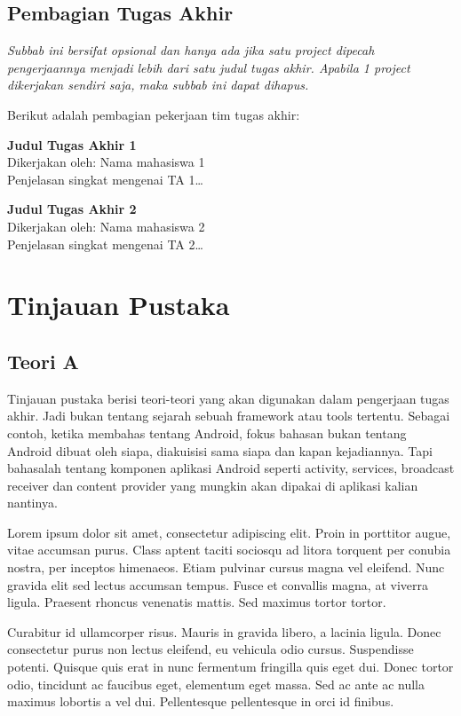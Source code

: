 \documentclass[a4paper,11pt,oneside]{report}
\begin{document}
\section{Pembagian Tugas Akhir}
\textit{Subbab ini bersifat opsional dan hanya ada jika satu project dipecah
pengerjaannya menjadi lebih dari satu judul tugas akhir. Apabila 1 project
dikerjakan sendiri saja, maka subbab ini dapat dihapus.}

Berikut adalah pembagian pekerjaan tim tugas akhir:

\textbf{Judul Tugas Akhir 1}\\
Dikerjakan oleh: Nama mahasiswa 1\\
Penjelasan singkat mengenai TA 1\ldots

\textbf{Judul Tugas Akhir 2}\\
Dikerjakan oleh: Nama mahasiswa 2\\
Penjelasan singkat mengenai TA 2\ldots

\chapter{Tinjauan Pustaka}

\section{Teori A}
Tinjauan pustaka berisi teori-teori yang akan digunakan dalam pengerjaan tugas
akhir. Jadi bukan tentang sejarah sebuah framework atau tools tertentu. Sebagai
contoh, ketika membahas tentang Android, fokus bahasan bukan tentang Android
dibuat oleh siapa, diakuisisi sama siapa dan kapan kejadiannya. Tapi bahasalah
tentang komponen aplikasi Android seperti activity, services, broadcast receiver
dan content provider yang mungkin akan dipakai di aplikasi kalian nantinya.

Lorem ipsum dolor sit amet, consectetur adipiscing elit. Proin in porttitor
augue, vitae accumsan purus. Class aptent taciti sociosqu ad litora torquent per
conubia nostra, per inceptos himenaeos. Etiam pulvinar cursus magna vel eleifend.
Nunc gravida elit sed lectus accumsan tempus. Fusce et convallis magna, at
viverra ligula. Praesent rhoncus venenatis mattis. Sed maximus tortor tortor.

Curabitur id ullamcorper risus. Mauris in gravida libero, a lacinia ligula.
Donec consectetur purus non lectus eleifend, eu vehicula odio cursus.
Suspendisse potenti. Quisque quis erat in nunc fermentum fringilla quis eget
dui. Donec tortor odio, tincidunt ac faucibus eget, elementum eget massa. Sed ac
ante ac nulla maximus lobortis a vel dui. Pellentesque pellentesque in orci id
finibus.
\end{document}
